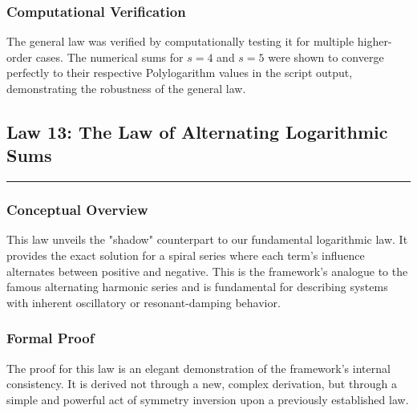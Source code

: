 \subsubsection*{Computational Verification}
The general law was verified by computationally testing it for multiple higher-order cases. The numerical sums for $s=4$ and $s=5$ were shown to converge perfectly to their respective Polylogarithm values in the script output, demonstrating the robustness of the general law.

\subsection*{Law 13: The Law of Alternating Logarithmic Sums}
\hrule
\vspace{0.3cm}
\vspace{0.5cm}

\subsubsection*{Conceptual Overview}
This law unveils the "shadow" counterpart to our fundamental logarithmic law. It provides the exact solution for a spiral series where each term's influence alternates between positive and negative. This is the framework's analogue to the famous alternating harmonic series and is fundamental for describing systems with inherent oscillatory or resonant-damping behavior.

\subsubsection*{Formal Proof}
The proof for this law is an elegant demonstration of the framework's internal consistency. It is derived not through a new, complex derivation, but through a simple and powerful act of symmetry inversion upon a previously established law.

